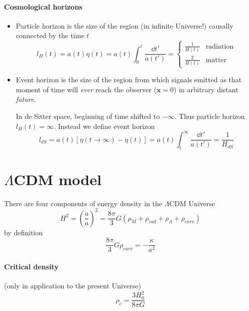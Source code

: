 \documentclass[12pt, a4paper, DIV=15]{article}
\numberwithin{equation}{section}
\begin{document}
\paragraph{Cosmological horizons}
\begin{itemize}
   \item Particle horizon is the size of the region (in infinite Universe!) causally connected by the time $t$
      \begin{equation}
         l_H(t) = a(t) \eta (t) = a(t) \int_0^t \frac{\dd{t'}}{a(t')} =
         \begin{cases}
            \frac{1}{H(t)} & \text{radiation} \\
            \frac{2}{H(t)} & \text{matter}
         \end{cases}
      \end{equation}
   \item Event horizon is the size of the region from which signals emitted as that moment of time will \textit{ever} reach the observer ($\pmb{x} = 0$) in arbitrary distant \textit{future}.

      In de Sitter space, beginning of time shifted to $-\infty$. Thus particle horizon $l_H(t) = \infty$. Instead we define event horizon
      \begin{equation}
         l_{dS} = a(t) \left[ \eta(t\rightarrow \infty) - \eta(t) \right]  = a(t) \int_t^\infty \frac{\dd{t'}}{a(t')} = \frac{1}{H_{dS}}
      \end{equation}
\end{itemize}

\section{$\Lambda$CDM model}
There are four components of energy density in the $\Lambda$CDM Universe
\begin{equation}
   H^2 = \left( \frac{\dot{a}}{a} \right)^2 = \frac{8\pi}{3} G \left( \rho_M + \rho_{rad} + \rho_\Lambda + \rho_{curv} \right)
\end{equation}
by definition
\begin{equation}
   \frac{8 \pi}{3} G \rho_{curv} = - \frac{\kappa}{a^2}
\end{equation}

\paragraph{Critical density} (only in application to the present Universe)
\begin{equation}
   \rho_c = \frac{3 H_0^2}{8\pi G}
\end{equation}
\end{document}
